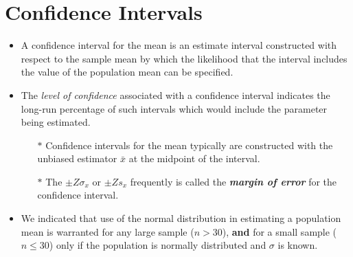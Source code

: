 \documentclass[]{report}
\begin{document}
\section*{Confidence Intervals}
\begin{itemize}
\item A confidence interval for the
mean is an estimate interval constructed with respect to the sample mean by which the likelihood that the interval
includes the value of the population mean can be specified.

\item The \emph{level of confidence} associated with a confidence interval indicates the long-run percentage
of such intervals which would include the parameter being estimated.

\begin{itemize}
\item[$\ast$] Confidence intervals for the mean typically are constructed with the unbiased estimator $\bar{x}$ at the midpoint
of the interval.

\item[$\ast$] The $\pm Z \sigma_x$ or $\pm Z s_x$ frequently is called the \textbf{\emph{margin of error}} for the confidence interval.
\end{itemize}

\item We indicated that use of the normal distribution in estimating a population mean is warranted
for any large sample ($n > 30$), \textbf{and} for a small sample ($n \leq 30$) only if the population is normally distributed
and $\sigma$ is known.
\end{itemize}
\end{document}
